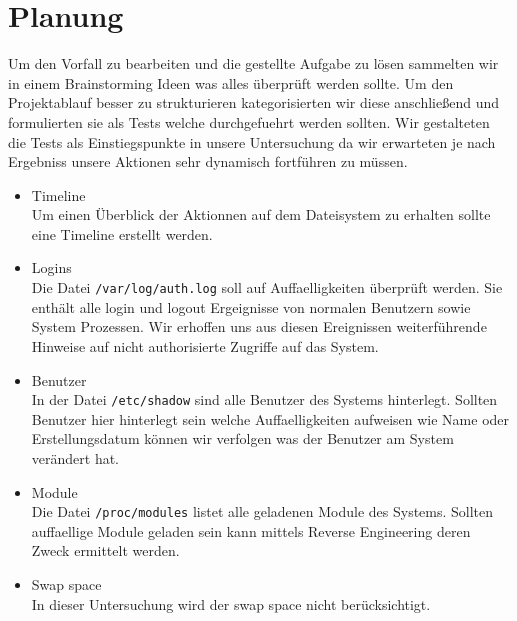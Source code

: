 \section{Planung}
Um den Vorfall zu bearbeiten und die gestellte Aufgabe zu lösen sammelten wir in einem Brainstorming Ideen was alles überprüft werden sollte. Um den Projektablauf besser zu strukturieren kategorisierten wir diese anschließend und formulierten sie als Tests welche durchgefuehrt werden sollten. Wir gestalteten die Tests als Einstiegspunkte in unsere Untersuchung da wir erwarteten je nach Ergebniss unsere Aktionen sehr dynamisch fortführen zu müssen.

\begin{itemize}
\item Timeline\\
Um einen Überblick der Aktionnen auf dem Dateisystem zu erhalten sollte eine Timeline erstellt werden.

\item Logins\\
Die Datei \texttt{/var/log/auth.log} soll auf Auffaelligkeiten überprüft werden. Sie enthält alle login und logout Ergeignisse von normalen Benutzern sowie System Prozessen. Wir erhoffen uns aus diesen Ereignissen weiterführende Hinweise auf nicht authorisierte Zugriffe auf das System.

\item Benutzer\\
In der Datei \texttt{/etc/shadow} sind alle Benutzer des Systems hinterlegt. Sollten Benutzer hier hinterlegt sein welche Auffaelligkeiten aufweisen wie Name oder Erstellungsdatum können wir verfolgen was der Benutzer am System verändert hat.

\item Module\\
Die Datei \texttt{/proc/modules} listet alle geladenen Module des Systems. Sollten auffaellige Module geladen sein kann mittels Reverse Engineering deren Zweck ermittelt werden.

\item Swap space\\
In dieser Untersuchung wird der swap space nicht berücksichtigt.
\end{itemize}